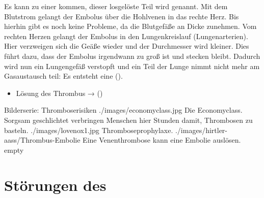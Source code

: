 {}
{}
{}

\TextSlide{\TxGefahren}
{
Es kann zu einer 
kommen, dieser losgelöste Teil wird
 genannt. Mit dem Blutstrom
gelangt der Embolus über die Hohlvenen in das rechte Herz.
Bis hierhin gibt es noch keine Probleme, da die Blutgefäße
an Dicke zunehmen. Vom rechten Herzen gelangt der
Embolus in den Lungenkreislauf (Lungenarterien). Hier
verzweigen sich die Geäße wieder und der Durchmesser
wird kleiner. Dies führt dazu, dass der Embolus irgendwann
zu groß ist und stecken bleibt. Dadurch wird nun ein 
Lungengefäß verstopft und ein Teil der Lunge nimmt nicht
mehr am Gasaustausch teil: Es entsteht eine
().
}{
\begin{itemize}
  \item Lösung des Thrombus →
   ()
\end{itemize}
}{}{}{}




\begin{PictureSeriesWide}{}{Bilderserie: Thromboserisiken}
{./images/economyclass.jpg}
{Die Economyclass. Sorgsam geschlichtet verbringen Menschen
hier Stunden damit, Thrombosen zu basteln.
}
{./images/lovenox1.jpg}
{Throm\-bose\-prophy\-laxe. }
{./images/hirtler-aass/Thrombus-Embolie}
{Eine Venenthrombose kann eine Embolie auslösen. 
}
{empty}
{}
\end{PictureSeriesWide}



\citep{Renz-Polster2006,SiewertChirurgie8,ScholzNotfallmedizin2,IntroClinEmergMed4,Longmore2007,Fauci2008}






\section{Störungen des }

